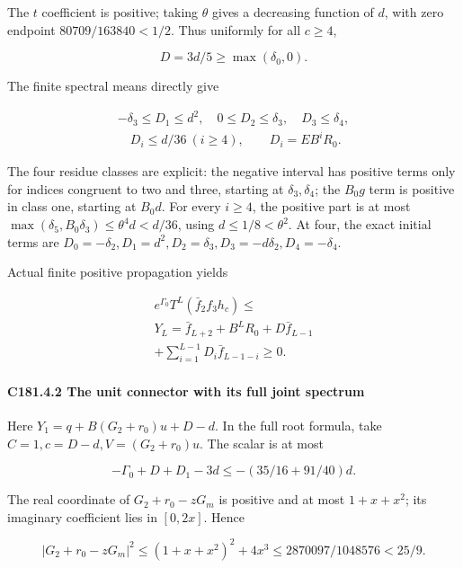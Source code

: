 The \(t\) coefficient is positive; taking \(\theta\) gives a decreasing function of \(d\), with zero endpoint \(80709/163840<1/2\). Thus uniformly for all \(c\ge4\),

\[
D=3d/5\ge\max( \delta_0,0).
\tag{C181.T190.21}
\]

The finite spectral means directly give

\[
\begin{gathered}
-\delta_3\le D_1\le d^2,\quad0\le D_2\le \delta_3,\quad D_3\le \delta_4,\\
\quad D_i\le d/36\ (i\ge4),\qquad D_i=EB^iR_0.
\end{gathered}\tag{C181.T190.22}
\]

The four residue classes are explicit: the negative interval has positive terms only for indices congruent to two and three, starting at \(\delta_3,\allowbreak \allowbreak  \delta_4\); the \(B_0g\) term is positive in class one, starting at \(B_0d\). For every \(i\ge4\), the positive part is at most \(\max(\delta_5,\allowbreak \allowbreak  B_0\delta_3)\le\theta^4d<d/36\), using \(d\le1/8<\theta^2\). At four, the exact initial terms are \(D_0=-\delta_2,\allowbreak \allowbreak  D_1=d^2,\allowbreak \allowbreak  D_2=\delta_3,\allowbreak \allowbreak  D_3=-d\delta_2,\allowbreak \allowbreak  D_4=-\delta_4\).

Actual finite positive propagation yields

\[
\begin{gathered}
e^{\Gamma_0}T^L(\bar f_2f_3h_c)\le\\
Y_L=\bar f_{L+2}+B^LR_0+D\bar f_{L-1}\\
+\sum_{i=1}^{L-1}D_i \bar f_{L-1-i}\ge0.
\end{gathered}\tag{C181.T190.23}
\]

\paragraph{C181.4.2 The unit connector with its full joint spectrum}

Here \(Y_1=q+B(G_2+r_0)u+D-d\). In the full root formula, take \(C=1,\allowbreak \allowbreak  c=D-d,\allowbreak \allowbreak  V=(G_2+r_0)u\). The scalar is at most

\[
-\Gamma_0+D+D_1-3d\le-(35/16+91/40)d.
\]

The real coordinate of \(G_2+r_0-zG_m\) is positive and at most \(1+x+x^2\); its imaginary coefficient lies in \([0,\allowbreak \allowbreak  2x]\). Hence

\[
|G_2+r_0-zG_m|^2\le(1+x+x^2)^2+4x^3
\le2870097/1048576<25/9.
\]

